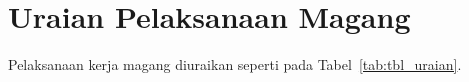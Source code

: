 




\section{Uraian Pelaksanaan Magang}
Pelaksanaan kerja magang diuraikan seperti pada Tabel~\ref{tab:tbl_uraian}.

